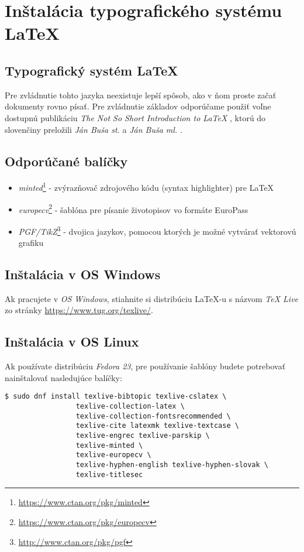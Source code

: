 \chapter{Inštalácia typografického systému \LaTeX}
\label{ch:instalacia}

\section{Typografický systém \LaTeX}

Pre zvládnutie tohto jazyka neexistuje lepší spôsob, ako v ňom proste začať dokumenty rovno písať. Pre zvládnutie základov odporúčame použiť voľne dostupnú publikáciu \emph{The Not So Short Introduction to \LaTeX} \cite{lshort}, ktorú do slovenčiny preložili \emph{Ján Buša st.} a \emph{Ján Buša ml.} \cite{lshortsk}.

\section{Odporúčané balíčky}
\begin{itemize}
    \item \emph{minted}\footnote{\url{https://www.ctan.org/pkg/minted}} - zvýrazňovač zdrojového kódu (syntax highlighter) pre \LaTeX 
    \item \emph{europecv}\footnote{\url{https://www.ctan.org/pkg/europecv}} - šablóna pre písanie životopisov vo formáte EuroPass 
    \item \emph{PGF/TikZ}\footnote{\url{http://www.ctan.org/pkg/pgf}} - dvojica jazykov, pomocou ktorých je možné vytvárať vektorovú grafiku 
\end{itemize}

\section{Inštalácia v OS Windows}

Ak pracujete v \emph{OS Windows}, stiahnite si distribúciu \LaTeX-u s názvom \emph{TeX Live} zo stránky \url{https://www.tug.org/texlive/}.

\section{Inštalácia v OS Linux}

Ak používate distribúciu \emph{Fedora 23}, pre používanie šablóny budete potrebovať nainštalovať nasledujúce balíčky:

\begin{verbatim}
$ sudo dnf install texlive-bibtopic texlive-cslatex \
                 texlive-collection-latex \
                 texlive-collection-fontsrecommended \
                 texlive-cite latexmk texlive-textcase \
                 texlive-engrec texlive-parskip \
                 texlive-minted \
                 texlive-europecv \
                 texlive-hyphen-english texlive-hyphen-slovak \
                 texlive-titlesec
\end{verbatim}


